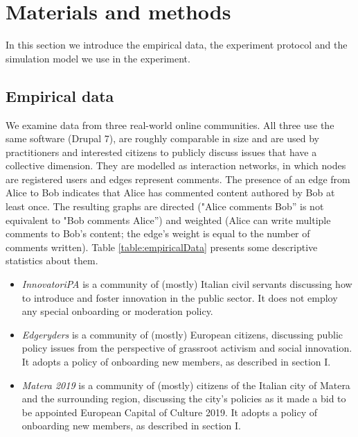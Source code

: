 \section{Materials and methods}

In this section we introduce the empirical data, the experiment protocol and the simulation model we use in the experiment. 

\subsection{Empirical data}

We examine data from three real-world online communities. All three use the same software (Drupal 7), are roughly comparable in size and are used by practitioners and interested citizens to publicly discuss issues that have a collective dimension. They are modelled as interaction networks, in which nodes are registered users and edges represent comments. The presence of an edge from Alice to Bob indicates that Alice has commented content authored by Bob at least once. The resulting graphs are directed ("Alice comments Bob'' is not equivalent to "Bob comments Alice'') and weighted (Alice can write multiple comments to Bob's content; the edge's weight is equal to the number of comments written). Table \ref{table:empiricalData} presents some descriptive statistics about them. 

\begin{itemize}
\item \emph{InnovatoriPA} is a community of (mostly) Italian civil servants discussing how to introduce and foster innovation in the public sector. It does not employ any special onboarding or moderation policy.
\item \emph{Edgeryders} is a community of (mostly) European citizens, discussing public policy issues from the perspective of grassroot activism and social innovation. It adopts a policy of onboarding new members, as described in section I.
\item \emph{Matera 2019} is a community of (mostly) citizens of the Italian city of Matera and the surrounding region, discussing the city's policies as it made a bid to be appointed European Capital of Culture 2019. It adopts a policy of onboarding new members, as described in section I.
\end{itemize}


